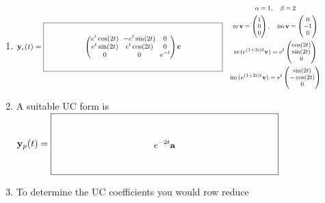 \documentclass[12pt,letterpaper]{article}
\newcommand{\KeyBox}[3]{%
  \vcenter{\hbox{$\boxed{\parbox[c][#2][c]{#1}{\centering\small
    \setlength{\arraycolsep}{3pt}\renewcommand{\arraystretch}{0.95}%
    \ensuremath{\displaystyle #3}}}$}}}
\newcommand{\KeySide}[2]{\quad\vcenter{\hbox{\parbox{#1}{\footnotesize\setlength{\arraycolsep}{2pt}\ensuremath{\begin{gathered}#2\end{gathered}}}}}}
\begin{document}
\begin{enumerate}
\begin{enumerate}
\item 
$\vect{y}_c(t)=\KeyBox{3.2in}{0.80in}{\begin{pmatrix}e^t\cos(2t)&-e^t\sin(2t)&0\\e^t\sin(2t)&e^t\cos(2t)&0\\0&0&e^{-t}\end{pmatrix}\vect{c}}\KeySide{2.4in}{\alpha=1,\quad\beta=2\\ \mathrm{re}\,\vect{v}=\begin{pmatrix}1\\0\\0\end{pmatrix},\quad\mathrm{im}\,\vect{v}=\begin{pmatrix}0\\-1\\0\end{pmatrix}\\\mathrm{re}\,(e^{(1+2i)t}\vect{v})=e^t\begin{pmatrix}\cos(2t)\\\sin(2t)\\0\end{pmatrix}\\\mathrm{im}\,(e^{(1+2i)t}\vect{v})=e^t\begin{pmatrix}\sin(2t)\\-\cos(2t)\\0\end{pmatrix}}$
\item A suitable UC form is
\newline
$\vect{y}_p(t)=\KeyBox{3.2in}{0.80in}{e^{-2t}\vect{a}}$
\item To determine the UC coefficients 
you would row reduce \newline


\end{enumerate}
\end{enumerate}
\end{document}
